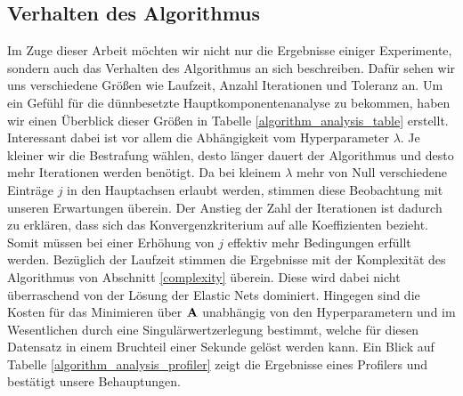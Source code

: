 

\subsection{Verhalten des Algorithmus}

Im Zuge dieser Arbeit möchten wir nicht nur die Ergebnisse einiger Experimente, sondern auch das Verhalten des Algorithmus an sich beschreiben. Dafür sehen wir uns verschiedene Größen wie Laufzeit, Anzahl Iterationen und Toleranz an. Um ein Gefühl für die dünnbesetzte Hauptkomponentenanalyse zu bekommen, haben wir einen Überblick dieser Größen in Tabelle \ref{algorithm_analysis_table} erstellt. Interessant dabei ist vor allem die Abhängigkeit vom Hyperparameter $\lambda$. Je kleiner wir die Bestrafung wählen, desto länger dauert der Algorithmus und desto mehr Iterationen werden benötigt. Da bei kleinem $\lambda$ mehr von Null verschiedene Einträge $j$ in den Hauptachsen erlaubt werden, stimmen diese Beobachtung mit unseren Erwartungen überein. Der Anstieg der Zahl der Iterationen ist dadurch zu erklären, dass sich das Konvergenzkriterium auf alle Koeffizienten bezieht. Somit müssen bei einer Erhöhung von $j$ effektiv mehr Bedingungen erfüllt werden. Bezüglich der Laufzeit stimmen die Ergebnisse mit der Komplexität des Algorithmus von Abschnitt \ref{complexity} überein. Diese wird dabei nicht überraschend von der Lösung der Elastic Nets dominiert. Hingegen sind die Kosten für das Minimieren über $\mathbf{A}$ unabhängig von den Hyperparametern und im Wesentlichen durch eine Singulärwertzerlegung bestimmt, welche für diesen Datensatz in einem Bruchteil einer Sekunde gelöst werden kann. Ein Blick auf Tabelle \ref{algorithm_analysis_profiler} zeigt die Ergebnisse eines Profilers und bestätigt unsere Behauptungen.

